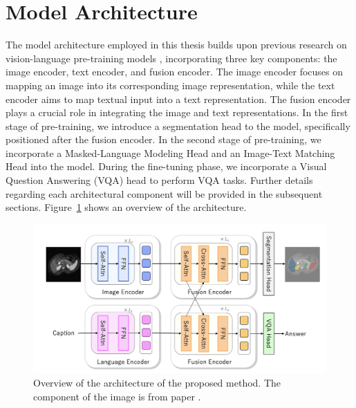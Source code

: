 \section{Model Architecture}
\label{Architecture}
The model architecture employed in this thesis builds upon previous research on vision-language pre-training models \cite{Dou_2022_CVPR}, incorporating three key components: the image encoder, text encoder, and fusion encoder. The image encoder focuses on mapping an image into its corresponding image representation, while the text encoder aims to map textual input into a text representation. The fusion encoder plays a crucial role in integrating the image and text representations. In the first stage of pre-training, we introduce a segmentation head to the model, specifically positioned after the fusion encoder. In the second stage of pre-training, we incorporate a Masked-Language Modeling Head and an Image-Text Matching Head into the model. During the fine-tuning phase, we incorporate a Visual Question Answering (VQA) head to perform VQA tasks. Further details regarding each architectural component will be provided in the subsequent sections. Figure~\ref{fig:modelArchitecture} shows an overview of the architecture. 

\begin{figure}[t]
\begin{center}
\includegraphics[width=1.0\linewidth]{Chapter_3/chap3_model.png}
\end{center}
   \caption{Overview of the architecture of the proposed method. The component of the image is from paper \cite{kavur2021chaos}.
}
\label{fig:modelArchitecture}
\end{figure}


